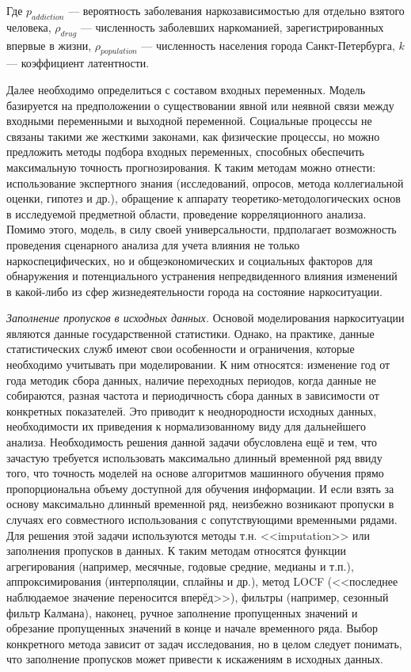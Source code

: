 Где \(p_{addiction}\) --- вероятность заболевания наркозависимостью для отдельно
взятого человека, \(\rho_{drug}\) --- численность заболевших наркоманией,
зарегистрированных впервые в жизни, \(\rho_{population}\) --- численность
населения города Санкт-Петербурга, \(k\) --- коэффициент латентности.

Далее необходимо определиться с составом входных переменных. Модель базируется
на предположении о существовании явной или неявной связи между входными
переменными и выходной переменной. Социальные процессы не связаны такими же
жесткими законами, как физические процессы, но можно предложить методы подбора
входных переменных, способных обеспечить максимальную точность прогнозирования.
К таким методам можно отнести: использование экспертного знания (исследований,
опросов, метода коллегиальной оценки, гипотез и др.), обращение к аппарату
теоретико-методологических основ в исследуемой предметной области, проведение
корреляционного анализа. Помимо этого, модель, в силу своей универсальности,
прдполагает возможность проведения сценарного анализа для учета влияния не
только наркоспецифических, но и общеэкономических и социальных факторов для
обнаружения и потенциального устранения непредвиденного влияния изменений в
какой-либо из сфер жизнедеятельности города на состояние наркоситуации.

\textit{Заполнение пропусков в исходных данных.} Основой моделирования
наркоситуации являются данные государственной статистики.  Однако, на практике,
данные статистических служб имеют свои особенности и ограничения, которые
необходимо учитывать при моделировании. К ним относятся: изменение год от года
методик сбора данных, наличие переходных периодов, когда данные не собираются,
разная частота и периодичность сбора данных в зависимости от конкретных
показателей. Это приводит к неоднородности исходных данных, необходимости их
приведения к нормализованному виду для дальнейшего анализа.  Необходимость
решения данной задачи обусловлена ещё и тем, что зачастую требуется использовать
максимально длинный временной ряд ввиду того, что точность моделей на основе
алгоритмов машинного обучения прямо пропорциональна объему доступной для
обучения информации. И если взять за основу максимально длинный временной ряд,
неизбежно возникают пропуски в случаях его совместного использования с
сопутствующими временными рядами.  Для решения этой задачи используются методы
т.н. <<imputation>> или заполнения пропусков в данных. К таким методам относятся
функции агрегирования (например, месячные, годовые средние, медианы и т.п.),
аппроксимирования (интерполяции, сплайны и др.), метод LOCF (<<последнее
наблюдаемое значение переносится вперёд>>), фильтры (например, сезонный фильтр
Калмана), наконец, ручное заполнение пропущенных значений и обрезание
пропущенных значений в конце и начале временного ряда. Выбор конкретного метода
зависит от задач исследования, но в целом следует понимать, что заполнение
пропусков  может привести к искажениям в исходных данных.

